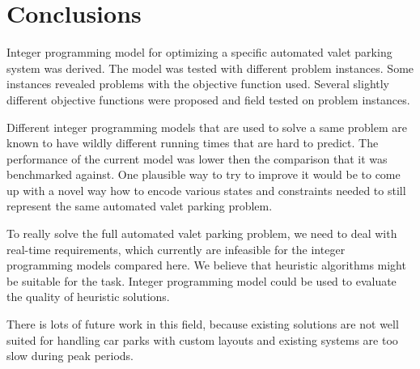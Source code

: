 \section{Conclusions}
Integer programming model for optimizing a specific automated valet parking
system was derived. The model was tested with different problem instances. Some
instances revealed problems with the objective function used. Several slightly
different objective functions were proposed and field tested on problem
instances.

Different integer programming models that are used to solve a same problem are
known to have wildly different running times that are hard to predict. The
performance of the current model was lower then the comparison that it was
benchmarked against. One plausible way to try to improve it would be to come up
with a novel way how to encode various states and constraints needed to still
represent the same automated valet parking problem.

To really solve the full automated valet parking problem, we need to deal with
real-time requirements, which currently are infeasible for the integer
programming models compared here. We believe that heuristic algorithms might be
suitable for the task. Integer programming model could be used to evaluate the
quality of heuristic solutions.

There is lots of future work in this field, because existing solutions are not
well suited for handling car parks with custom layouts and existing systems are
too slow during peak periods.
